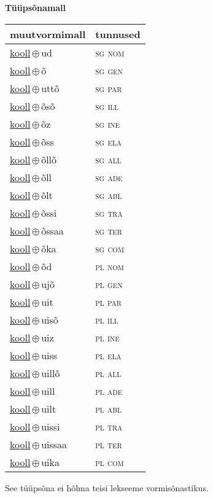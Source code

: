 

\vspace{3.5em}
\noindent \begin{minipage}{\textwidth}
\noindent \textbf{Tüüpsõnamall \,}\\

\begin{sideways}
\begin{tabular}{l l}
muutvormimall & tunnused \\
\hline
\underline{kooll}\,$\oplus$\,ud & \textsc{ sg nom } \\
\underline{kooll}\,$\oplus$\,õ & \textsc{ sg gen } \\
\underline{kooll}\,$\oplus$\,uttõ & \textsc{ sg par } \\
\underline{kooll}\,$\oplus$\,õsõ & \textsc{ sg ill } \\
\underline{kooll}\,$\oplus$\,õz & \textsc{ sg ine } \\
\underline{kooll}\,$\oplus$\,õss & \textsc{ sg ela } \\
\underline{kooll}\,$\oplus$\,õllõ & \textsc{ sg all } \\
\underline{kooll}\,$\oplus$\,õll & \textsc{ sg ade } \\
\underline{kooll}\,$\oplus$\,õlt & \textsc{ sg abl } \\
\underline{kooll}\,$\oplus$\,õssi & \textsc{ sg tra } \\
\underline{kooll}\,$\oplus$\,õssaa & \textsc{ sg ter } \\
\underline{kooll}\,$\oplus$\,õka & \textsc{ sg com } \\
\underline{kooll}\,$\oplus$\,õd & \textsc{ pl nom } \\
\underline{kooll}\,$\oplus$\,ujõ & \textsc{ pl gen } \\
\underline{kooll}\,$\oplus$\,uit & \textsc{ pl par } \\
\underline{kooll}\,$\oplus$\,uisõ & \textsc{ pl ill } \\
\underline{kooll}\,$\oplus$\,uiz & \textsc{ pl ine } \\
\underline{kooll}\,$\oplus$\,uiss & \textsc{ pl ela } \\
\underline{kooll}\,$\oplus$\,uillõ & \textsc{ pl all } \\
\underline{kooll}\,$\oplus$\,uill & \textsc{ pl ade } \\
\underline{kooll}\,$\oplus$\,uilt & \textsc{ pl abl } \\
\underline{kooll}\,$\oplus$\,uissi & \textsc{ pl tra } \\
\underline{kooll}\,$\oplus$\,uissaa & \textsc{ pl ter } \\
\underline{kooll}\,$\oplus$\,uika & \textsc{ pl com } \\
\end{tabular}
\end{sideways}
\label{tab:tüüpsõnamall-koollud}

\end{minipage}

 
\vspace{1em}
\noindent See tüüpsõna ei hõlma teisi lekseeme vormi\-sõnastikus.
